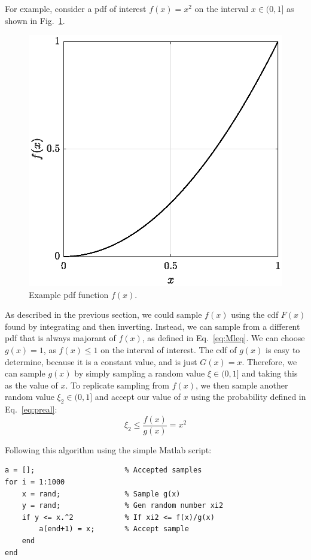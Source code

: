 For example, consider a
\gls{pdf} of interest $f(x) = x^2$ on the interval $x \in (0,1]$ as shown
in Fig.~\ref{fig:circle_square}.
\begin{figure}[hbt]
  \centering
  \includegraphics[scale=0.75]{images/circle}
  \caption{Example \acrshort{pdf} function $f(x)$.}
  \label{fig:circle_square}
\end{figure}
As described in the previous section, we could sample $f(x)$ using the
\gls{cdf} $F(x)$ found by integrating and then inverting. Instead, we can sample from a
different \gls{pdf} that is always majorant of $f(x)$, as defined in
Eq.~\eqref{eq:Mleq}. We can choose $g(x) = 1$, as $f(x) \leq 1$ on
the interval of interest. The \gls{cdf} of $g(x)$ is easy to
determine, because it is a constant value, and is just $G(x) =
x$. Therefore, we can sample $g(x)$ by simply sampling a random value $\xi
\in (0,1]$ and taking this as the value of $x$. To replicate sampling
from $f(x)$, we then sample another random value $\xi_2 \in (0,1]$ and
accept our value of $x$ using the probability defined in Eq.~\eqref{eq:preal}:
\begin{equation*}
  \xi_2 \leq \frac{f(x)}{g(x)} = x^2
\end{equation*}

\begin{minipage}{1.0\linewidth}
Following this algorithm using the simple Matlab script:
\begin{lstlisting}
a = [];                     % Accepted samples
for i = 1:1000
    x = rand;               % Sample g(x)
    y = rand;               % Gen random number xi2
    if y <= x.^2            % If xi2 <= f(x)/g(x)
        a(end+1) = x;       % Accept sample
    end
end
\end{lstlisting}
\end{minipage}

